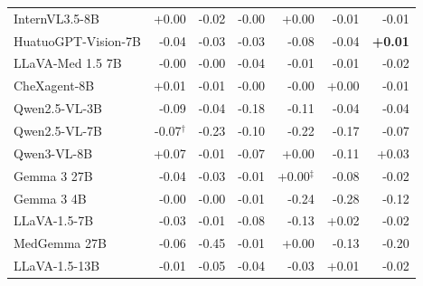 \documentclass{article}
\begin{document}
\begin{table}[htbp]
{\begin{tabular}{lrrrrrr}
InternVL3.5-8B & \cellcolor{cfTerra1}+0.00 & \cellcolor{cfSlate1}-0.02 & \cellcolor{cfSlate1}-0.00 & \cellcolor{cfTerra1}+0.00 & \cellcolor{cfSlate1}-0.01 & \cellcolor{cfSlate1}-0.01 \\
HuatuoGPT-Vision-7B & \cellcolor{cfSlate2}-0.04 & \cellcolor{cfSlate2}-0.03 & \cellcolor{cfSlate2}-0.03 & \cellcolor{cfSlate2}-0.08 & \cellcolor{cfSlate2}-0.04 & \cellcolor{cfTerra1}\textbf{+0.01} \\
LLaVA-Med 1.5 7B & \cellcolor{cfSlate1}-0.00 & \cellcolor{cfSlate1}-0.00 & \cellcolor{cfSlate2}-0.04 & \cellcolor{cfSlate1}-0.01 & \cellcolor{cfSlate1}-0.01 & \cellcolor{cfSlate2}-0.02 \\
CheXagent-8B & \cellcolor{cfTerra1}+0.01 & \cellcolor{cfSlate1}-0.01 & \cellcolor{cfSlate1}-0.00 & \cellcolor{cfSlate1}-0.00 & \cellcolor{cfTerra1}+0.00 & \cellcolor{cfSlate1}-0.01 \\
Qwen2.5-VL-3B & \cellcolor{cfSlate2}-0.09 & \cellcolor{cfSlate2}-0.04 & \cellcolor{cfSlate3}-0.18 & \cellcolor{cfSlate3}-0.11 & \cellcolor{cfSlate2}-0.04 & \cellcolor{cfSlate2}-0.04 \\
Qwen2.5-VL-7B & \cellcolor{cfSlate2}-0.07$^{\dagger}$ & \cellcolor{cfSlate3}-0.23 & \cellcolor{cfSlate3}-0.10 & \cellcolor{cfSlate3}-0.22 & \cellcolor{cfSlate3}-0.17 & \cellcolor{cfSlate2}-0.07 \\
Qwen3-VL-8B & \cellcolor{cfTerra2}+0.07 & \cellcolor{cfSlate1}-0.01 & \cellcolor{cfSlate2}-0.07 & \cellcolor{cfTerra1}+0.00 & \cellcolor{cfSlate3}-0.11 & \cellcolor{cfTerra2}+0.03 \\
Gemma 3 27B & \cellcolor{cfSlate2}-0.04 & \cellcolor{cfSlate2}-0.03 & \cellcolor{cfSlate1}-0.01 & \cellcolor{cfTerra1}+0.00$^{\ddagger}$ & \cellcolor{cfSlate2}-0.08 & \cellcolor{cfSlate1}-0.02 \\
Gemma 3 4B & \cellcolor{cfSlate1}-0.00 & \cellcolor{cfSlate1}-0.00 & \cellcolor{cfSlate1}-0.01 & \cellcolor{cfSlate3}-0.24 & \cellcolor{cfSlate4}-0.28 & \cellcolor{cfSlate3}-0.12 \\
LLaVA-1.5-7B & \cellcolor{cfSlate2}-0.03 & \cellcolor{cfSlate1}-0.01 & \cellcolor{cfSlate2}-0.08 & \cellcolor{cfSlate3}-0.13 & \cellcolor{cfTerra2}+0.02 & \cellcolor{cfSlate1}-0.02 \\
MedGemma 27B & \cellcolor{cfSlate2}-0.06 & \cellcolor{cfSlate4}-0.45 & \cellcolor{cfSlate1}-0.01 & \cellcolor{cfTerra1}+0.00 & \cellcolor{cfSlate3}-0.13 & \cellcolor{cfSlate3}-0.20 \\
LLaVA-1.5-13B & \cellcolor{cfSlate1}-0.01 & \cellcolor{cfSlate2}-0.05 & \cellcolor{cfSlate2}-0.04 & \cellcolor{cfSlate2}-0.03 & \cellcolor{cfTerra1}+0.01 & \cellcolor{cfSlate1}-0.02 \\

\end{tabular}}
\end{table}
\end{document}
